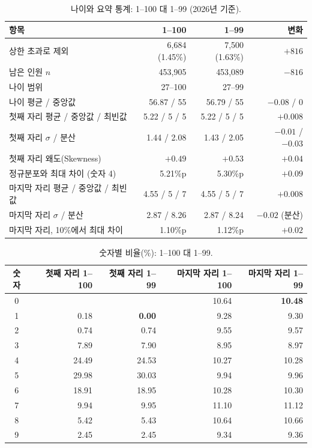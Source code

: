 \documentclass[11pt]{article}
\begin{document}
\begin{table}[H]
  \centering
  \caption{나이와 요약 통계: 1--100 대 1--99 (2026년 기준).}
  \label{tab:age-filter-stats}
  \begin{tabular}{lrrr}
    \toprule
    항목 & 1--100 & 1--99 & 변화 \\
    \midrule
    상한 초과로 제외 & 6{,}684 (1.45\%) & 7{,}500 (1.63\%) & $+816$ \\
    \midrule
    남은 인원 $n$ & 453{,}905 & 453{,}089 & $-816$ \\
    \midrule
    나이 범위 & 27--100 & 27--99 & \\
    \midrule
    나이 평균 / 중앙값 & 56.87 / 55 & 56.79 / 55 & $-0.08$ / 0 \\
    \midrule
    첫째 자리 평균 / 중앙값 / 최빈값 & 5.22 / 5 / 5 & 5.22 / 5 / 5 & $+0.008$ \\
    \midrule
    첫째 자리 $\sigma$ / 분산 & 1.44 / 2.08 & 1.43 / 2.05 & $-0.01$ / $-0.03$ \\
    \midrule
    첫째 자리 왜도(Skewness) & $+0.49$ & $+0.53$ & $+0.04$ \\
    \midrule
    정규분포와 최대 차이 (숫자 4) & 5.21\%p & 5.30\%p & $+0.09$ \\
    \midrule
    마지막 자리 평균 / 중앙값 / 최빈값 & 4.55 / 5 / 7 & 4.55 / 5 / 7 & $+0.008$ \\
    \midrule
    마지막 자리 $\sigma$ / 분산 & 2.87 / 8.26 & 2.87 / 8.24 & $-0.02$ (분산) \\
    \midrule
    마지막 자리, 10\%에서 최대 차이 & 1.10\%p & 1.12\%p & $+0.02$ \\
    \bottomrule
  \end{tabular}
\end{table}

\begin{table}[H]
  \centering
  \caption{숫자별 비율(\%): 1--100 대 1--99.}
  \label{tab:age-filter-digits}
  \begin{tabular}{crrrr}
    \toprule
    숫자 & 첫째 자리 1--100 & 첫째 자리 1--99 & 마지막 자리 1--100 & 마지막 자리 1--99 \\
    \midrule
    0 &  &  & 10.64 & \textbf{10.48} \\
    \midrule
    1 & 0.18 & \textbf{0.00} & 9.28 & 9.30 \\
    \midrule
    2 & 0.74 & 0.74 & 9.55 & 9.57 \\
    \midrule
    3 & 7.89 & 7.90 & 8.95 & 8.97 \\
    \midrule
    4 & 24.49 & 24.53 & 10.27 & 10.28 \\
    \midrule
    5 & 29.98 & 30.03 & 9.94 & 9.96 \\
    \midrule
    6 & 18.91 & 18.95 & 10.28 & 10.30 \\
    \midrule
    7 & 9.94 & 9.95 & 11.10 & 11.12 \\
    \midrule
    8 & 5.42 & 5.43 & 10.64 & 10.66 \\
    \midrule
    9 & 2.45 & 2.45 & 9.34 & 9.36 \\
    \bottomrule
  \end{tabular}
\end{table}
\end{document}
